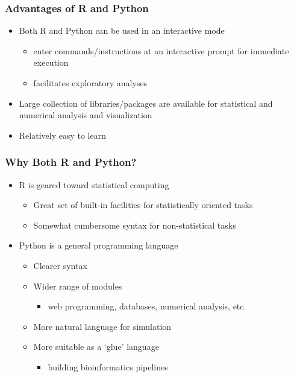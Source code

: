 \documentclass{beamer}
\begin{document}
\begin{frame}
  \frametitle{Advantages of R and Python}
\begin{itemize}

\item Both R and Python can be used in an interactive mode

\begin{itemize}
	\item enter commands/instructions at an interactive prompt for immediate execution
	\item facilitates exploratory analyses 
\end{itemize}

\item Large collection of libraries/packages are available for statistical and numerical analysis and visualization

\item Relatively easy to learn

\end{itemize}

\end{frame}

\begin{frame}
  \frametitle{Why Both R and Python?}
\begin{itemize}

\item R is geared toward statistical computing
\begin{itemize}
	\item Great set of built-in facilities for statistically oriented tasks
	\item Somewhat cumbersome syntax for non-statistical tasks
\end{itemize}

\item Python is a general programming language
\begin{itemize}
	\item Clearer syntax
 \item Wider range of modules
		\begin{itemize}
			\item web programming, databases, numerical analysis, etc.
		\end{itemize}
	\item More natural language for simulation
	\item More suitable as a `glue' language
		\begin{itemize}
			\item building bioinformatics pipelines
		\end{itemize}
\end{itemize}

\end{itemize}

\end{frame}
\end{document}
